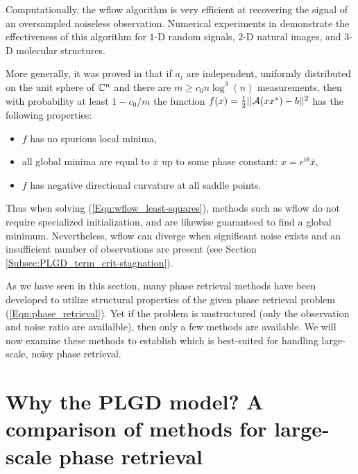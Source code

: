 \begin{enumerate}
Computationally, the wflow algorithm is very efficient at recovering the signal of an oversampled noiseless observation.  Numerical experiments in \cite[Section 4]{DBLP:journals/tit/CandesLS15} demonstrate the effectiveness of this algorithm for $1$-D random signals, $2$-D natural images, and $3$-D molecular structures.  


More generally, it was proved in \cite{sun2016geometric} that if $a_i$ are independent, uniformly distributed on the unit sphere of ${\mathbb C}^n$ and there are $m \geq c_0 n \log^3(n)$ measurements, then with probability at least $1-c_0/m$ the function $f(x) = \frac{1}{2}||{\mathcal A}(xx^*) - b||^2$ has the following properties:

\begin{itemize} 		

\item 
$f$ has no spurious local minima,

\item
all global minima are equal to $\bar{x}$ up to some phase constant: $x = e^{i \theta}\bar{x}$,

\item
$f$ has negative directional curvature at all saddle points.

\end{itemize}

Thus when solving (\ref{Eqn:wflow_least-squares}), methods such as wflow do not require specialized initialization, and are likewise guaranteed to find a global minimum.  Nevertheless, wflow can diverge when significant noise exists and an insufficient number of observations are present (see Section \ref{Subsec:PLGD_term_crit-stagnation}).

\end{enumerate}


As we have seen in this section, many phase retrieval methods have been developed to utilize structural properties of the given phase retrieval problem (\ref{Eqn:phase_retrieval}).  Yet if the problem is unstructured (only the observation and noise ratio are availalble), then only a few methods are available.   We will now examine these methods to establish which is best-suited for handling large-scale, noisy phase retrieval.




\section{Why the PLGD model?  A comparison of methods for large-scale phase retrieval}	\label{Subsubsec:phase_retrieval-why_optimize_PLGD_model}



